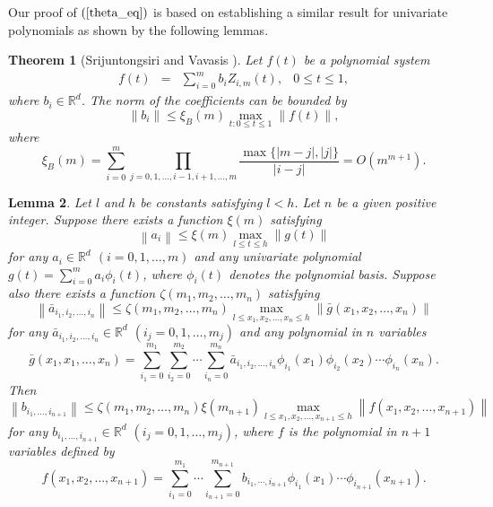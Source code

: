 \documentclass{article}
\newcommand{\norm}[1]{\left\|#1\right\|} \newcommand{\norma}[1]{\left\|#1\right\|}   \newcommand{\inv}[1]{#1^{-1}}
\newcommand\eref[1]{$(\ref{#1})$}
\newtheorem{theorem}{Theorem}[section]
\newtheorem{lemma}[theorem]{Lemma}
\begin{document}
Our proof of \eref{theta_eq} is based on establishing a similar
result for univariate polynomials as shown by the following
lemmas.
\begin{theorem}[Srijuntongsiri and Vavasis \cite{srijuntongsiri_basis}]
\label{bibound} Let $f(t)$ be a polynomial system
\[
\begin{array}{llll}
f(t) &=& \sum_{i=0}^m b_{i} Z_{i,m}(t), & 0 \leq t \leq 1,
\end{array}
\]
where $b_{i} \in \mathbb{R}^d$. The norm of the coefficients can
be bounded by
\[
\norm{b_{i}} \leq  \xi_B(m) \max_{t : 0 \leq t \leq 1}
\norm{f(t)},
\]
where
\[
\xi_B(m) = \sum_{i=0}^m \prod_{j=0,1,\ldots,i-1,i+1,\ldots,m}
\frac{\max\{|m-j|,|j|\}}{|i-j|} = O(m^{m+1}).
\]
\end{theorem}

\begin{lemma}
\label{theta_to_gen} 
Let $l$ and $h$ be constants satisfying $l
< h$.  Let $n$ be a given positive integer.  Suppose there exists a function $\xi(m)$ satisfying
\begin{equation}
\label{eq:bound_1d}
\norm{a_{i}} \leq \xi(m) \max_{l \leq t \leq h} \norm{g(t)}
\end{equation}
for any $a_i \in \mathbb{R}^d$ $(i = 0,1,\ldots,m)$ and any univariate polynomial
$g(t) = \sum_{i=0}^m a_i \phi_i(t)$, where $\phi_i(t)$ denotes the
polynomial basis.  Suppose also there exists a function $\zeta(m_1, m_2, \ldots, m_n)$ satisfying
\begin{equation}
\label{eq:bound_nd}
\norm{\bar a_{i_1,i_2,\ldots,i_n}} \leq \zeta(m_1, m_2, \ldots, m_n) \max_{l \leq x_1, x_2, \ldots, x_n \leq h} \norm{\bar g(x_1,x_2,\ldots,x_n)}
\end{equation}
for any $\bar a_{i_1,i_2,\ldots,i_n} \in \mathbb{R}^d$ $(i_j = 0,1,\ldots,m_j)$ and any polynomial in $n$ variables 
\[
\bar g(x_1,x_1,\ldots,x_n) = \sum_{i_1=0}^{m_1}\sum_{i_2=0}^{m_2}\cdots \sum_{i_n=0}^{m_n} \bar a_{i_1,i_2,\ldots,i_n} \phi_{i_1}(x_1) \phi_{i_2}(x_2)\cdots \phi_{i_n}(x_n).
\]
Then
\begin{equation}
\norm{b_{i_1,\ldots, i_{n+1}}} \leq \zeta(m_1, m_2, \ldots, m_n)\xi(m_{n+1}) \max_{l \leq x_1, x_2, \ldots, x_{n+1} \leq h}
\norm{f(x_1, x_2, \ldots, x_{n+1})}
\end{equation}
for any $b_{i_1,\ldots,i_{n+1}} \in \mathbb{R}^d$ $(i_j = 0,1,\ldots,m_j)$, where
$f$ is the 
polynomial in $n+1$ variables defined by 
\begin{equation}
\label{definef}
f(x_1,x_2,\ldots,x_{n+1}) = 
\sum_{i_1 = 0}^{m_1}\cdots \sum_{i_{n+1}=0}^{m_{n+1}} b_{i_1,  \cdots, i_{n+1}} \phi_{i_1}(x_1) \cdots \phi_{i_{n+1}}(x_{n+1}).
\end{equation}
\end{lemma}
\end{document}
